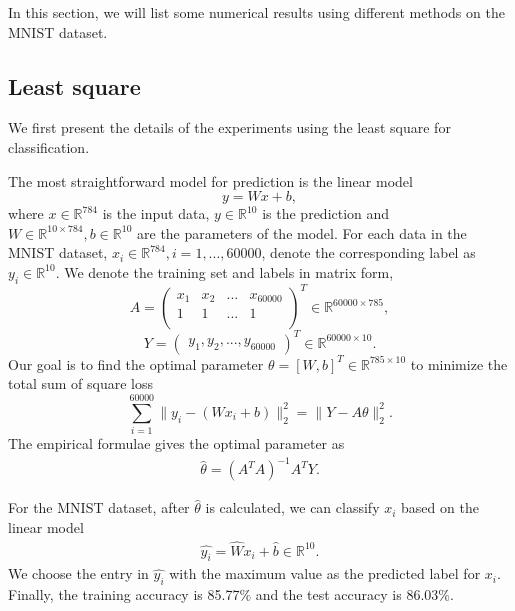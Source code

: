 
In this section, we will list some numerical results using different methods on the MNIST dataset. 

\subsection{Least square}

We first present the details of the experiments using the least square for classification. 

The most straightforward model for prediction is the linear model
$$
y=Wx+b,
$$
where $x\in \mathbb{R}^{784}$ is the input data, $y\in \mathbb{R}^{10}$ is the prediction and $W \in \mathbb{R}^{10 \times 784}, b \in \mathbb{R}^{10} $ are the parameters of the model. 
For each data in the MNIST dataset, $x_i\in \mathbb{R}^{784}, i=1,...,60000$, denote the corresponding label as $y_i\in \mathbb{R}^{10}$. 
We denote the training set and labels in matrix form, 
$$A=\begin{pmatrix}
    x_{1} &x_{2}  &...  &x_{60000}     \\
    1&1&... &1\\
\end{pmatrix}^T \in \mathbb{R}^{60000\times 785},$$ 
$$Y=\begin{pmatrix}
    y_{1}        ,
    y_{2}       ,
    ... ,
    y_{60000}     
\end{pmatrix}^T\in \mathbb{R}^{60000\times 10}.
$$
Our goal is to find the optimal parameter 
$\theta=\left[ W ,b  \right]^T\in \mathbb{R}^{785\times 10}$ to minimize the total sum of square loss 
$$
\sum_{i=1}^{60000} \|y_i-(W x_i+b)\|^2_2=\|Y- A\theta\|^2_2.
$$
The empirical formulae gives the optimal parameter as
\begin{align}
\hat{\theta}=(A^TA)^{-1}A^TY.
\end{align}


For the MNIST dataset, after $\hat{\theta}$ is calculated, we can classify $x_i$ based on the linear model
\begin{align}
\hat{y_i}=\hat{W}x_i+\hat{b} \in \mathbb{R}^{10}.
\end{align}
We choose the entry in $\hat{y_i}$ with the maximum value as the predicted label for $x_i$. Finally, the training accuracy is 85.77$\%$ and the test accuracy is 86.03$\%$. 

